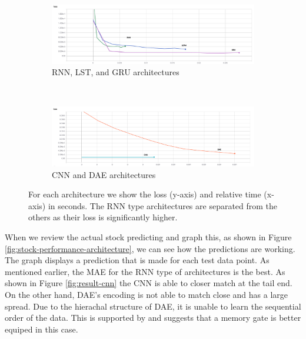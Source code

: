 \documentclass[11pt]{article}
\begin{document}

\begin{figure}
    \centering
    \begin{subfigure}[b]{1\textwidth}
        \includegraphics[width=\textwidth]{media/cpu-loss-performance}
        \caption{RNN, LST, and GRU architectures}
        \label{fig:cpu-loss-rnns}
    \end{subfigure}
    ~ %
    \begin{subfigure}[b]{1\textwidth}
        \includegraphics[width=\textwidth]{media/cpu-loss-performance-other}
        \caption{CNN and DAE architectures}
        \label{fig:cpu-loss-others}
    \end{subfigure}
    \caption{For each architecture we show the loss (y-axis) and relative time (x-axis) in seconds. The RNN type architectures are separated from the others as their loss is significantly higher.}
    \label{fig:cpu-loss-performance}
\end{figure}

When we review the actual stock predicting and graph this, as shown in Figure \ref{fig:stock-performance-architecture}, we can see how the predictions are working. The graph displays a prediction that is made for each test data point. As mentioned earlier, the MAE for the RNN type of architectures is the best. As shown in Figure \ref{fig:result-cnn} the CNN is able to closer match at the tail end. On the other hand, DAE's encoding is not able to match close and has a large spread. Due to the hierachal structure of DAE, it is unable to learn the sequential order of the data. This is supported by \citet{ChoOnApproaches} and suggests that a memory gate is better equiped in this case.
\end{document}
